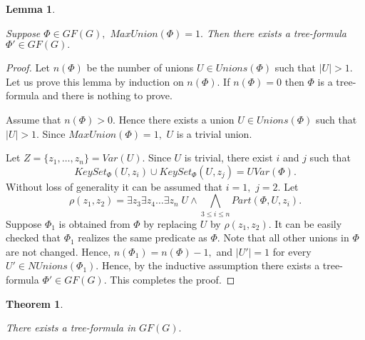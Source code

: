 \documentclass{au}
\theoremstyle{plain}
\newtheorem{theorem}{Theorem}
\newtheorem{lemma}{Lemma}
\theoremstyle{definition}
\theoremstyle{remark}
\numberwithin{equation}{section}
\begin{document}
\begin{lemma}\label{UbratTrivialnie}

Suppose $\Phi\in GF(G),$ $MaxUnion(\Phi)=1.$
Then there exists a tree-formula $\Phi'\in GF(G).$

\end{lemma}

\begin{proof}

Let $n(\Phi)$ be the number of unions $U\in Unions(\Phi)$ such that $|U|>1.$
Let us prove this lemma by induction on $n(\Phi).$
If $n(\Phi)=0$ then $\Phi$ is a tree-formula and there is nothing to prove.

Assume that $n(\Phi)>0.$
Hence there exists a union $U\in Unions(\Phi)$ such that $|U|>1.$
Since $MaxUnion(\Phi)=1,$
$U$ is a trivial union.

Let $Z=\{z_{1},\ldots,z_{n}\} = Var(U).$
Since $U$ is trivial, there exist $i$ and $j$ such that
$$KeySet_{\Phi}(U, z_{i}) \cup KeySet_{\Phi}(U, z_{j}) = UVar(\Phi).$$
Without loss of generality it can be assumed that $i = 1,$ $j = 2.$
Let
$$\rho(z_{1},z_{2}) = \exists z_{3}\exists z_{4}\ldots\exists z_{n}\;
U \wedge \bigwedge \limits_{3\le i\le n} Part(\Phi,U,z_{i}).$$
Suppose $\Phi_{1}$ is obtained from $\Phi$ by replacing $U$ by $\rho(z_{1},z_{2}).$
It can be easily checked that $\Phi_{1}$ realizes the same predicate as $\Phi.$
Note that all other unions in $\Phi$ are not changed.
Hence, $n(\Phi_{1})=n(\Phi)-1,$
and $|U'|=1$ for every $U'\in NUnions(\Phi_{1}).$
Hence, by the inductive assumption
there exists a tree-formula $\Phi'\in GF(G).$
This completes the proof.

\end{proof}

\begin{theorem}\label{estTreeFormula}

There exists a tree-formula in $GF(G).$

\end{theorem}
\end{document}
